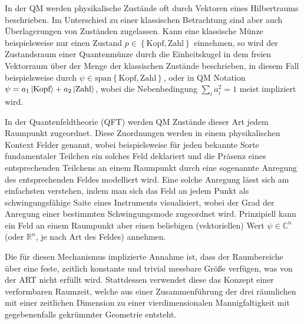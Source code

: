 In der QM werden physikalische Zustände oft durch Vektoren eines
Hilbertraums beschrieben. Im Unterschied zu einer klassischen
Betrachtung sind aber auch Überlagerungen von Zuständen
zugelassen. Kann eine klassische Münze beispielsweise nur einen
Zustand $p \in \left\lbrace \textrm{Kopf}, \textrm{Zahl}\right\rbrace$
einnehmen, so wird der Zustandsraum einer Quantenmünze durch die
Einheitskugel in dem freien Vektorraum über der Menge der klassischen
Zustände beschrieben, in diesem Fall beispielsweise durch $\psi \in
\textrm{span} \left\lbrace \textrm{Kopf}, \textrm{Zahl}\right\rbrace$,
oder in QM Notation $\psi = a_1 \left\vert \textrm{Kopf}\right> + a_2 \left\vert \textrm{Zahl}\right>$,
wobei die Nebenbedingung $\sum_i a^ 2_i = 1$ meist impliziert wird.

In der Quantenfeldtheorie (QFT) werden QM Zustände dieser Art jedem
Raumpunkt zugeordnet. Diese Zuordnungen werden in einem physikalischen
Kontext Felder genannt, wobei beispielsweise für jeden bekannte Sorte
fundamentaler Teilchen ein solches Feld deklariert und die Präsenz
eines entsprechenden Teilchens an einem Raumpunkt durch eine
sogenannte \glqq Anregung\grqq{} des entsprechenden Feldes modelliert
wird. Eine solche Anregung lässt sich am einfachsten verstehen, indem
man sich das Feld an jedem Punkt als schwingungsfähige Saite eines
Instruments visualisiert, wobei der Grad der Anregung einer bestimmten
Schwingungsmode zugeordnet wird. Prinzipiell kann ein Feld an einem
Raumpunkt aber einen beliebigen (vektoriellen) Wert $\psi\in\mathbb{C}^n$ (oder $\mathbb{R}^n$,
je nach Art des Feldes) annehmen.

Die für diesen Mechanismus implizierte Annahme ist, dass der
Raumbereiche über eine feste, zeitlich konstante und trivial messbare
Größe verfügen, was von der ART nicht erfüllt wird. Stattdessen
verwendet diese das Konzept einer verformbaren Raumzeit, welche aus
einer Zusammenführung der drei räumlichen mit einer zeitlichen
Dimension zu einer vierdimensionalen Mannigfaltigkeit mit
gegebenenfalls gekrümmter Geometrie entsteht.
